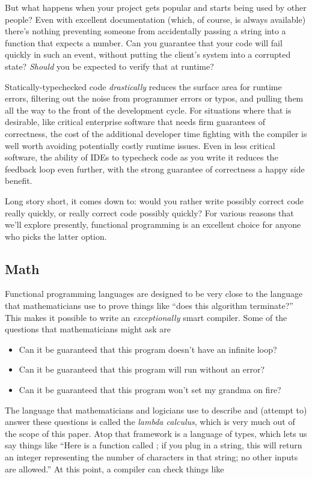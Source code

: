 But what happens when your project gets popular and starts being used by other people? Even with excellent documentation (which, of course, is always available) there's nothing preventing someone from accidentally passing a string into a function that expects a number. Can you guarantee that your code will fail quickly in such an event, without putting the client's system into a corrupted state? \emph{Should} you be expected to verify that at runtime?

Statically-typechecked code \emph{drastically} reduces the surface area for runtime errors, filtering out the noise from programmer errors or typos, and pulling them all the way to the front of the development cycle. For situations where that is desirable, like critical enterprise software that needs firm guarantees of correctness, the cost of the additional developer time fighting with the compiler is well worth avoiding potentially costly runtime issues. Even in less critical software, the ability of IDEs to typecheck code as you write it reduces the feedback loop even further, with the strong guarantee of correctness a happy side benefit.

Long story short, it comes down to: would you rather write possibly correct code really quickly, or really correct code possibly quickly? For various reasons that we'll explore presently, functional programming is an excellent choice for anyone who picks the latter option.

\subsection{Math}

Functional programming languages are designed to be very close to the language that mathematicians use to prove things like ``does this algorithm terminate?'' This makes it possible to write an \emph{exceptionally} smart compiler. Some of the questions that mathematicians might ask are

\begin{itemize}
    \item Can it be guaranteed that this program doesn't have an infinite loop?
    \item Can it be guaranteed that this program will run without an error?
    \item Can it be guaranteed that this program won't set my grandma on fire?
\end{itemize}

The language that mathematicians and logicians use to describe and (attempt to) answer these questions is called the \emph{lambda calculus}, which is very much out of the scope of this paper. Atop that framework is a language of types, which lets us say things like ``Here is a function called ; if you plug in a string, this will return an integer representing the number of characters in that string; no other inputs are allowed.'' At this point, a compiler can check things like


